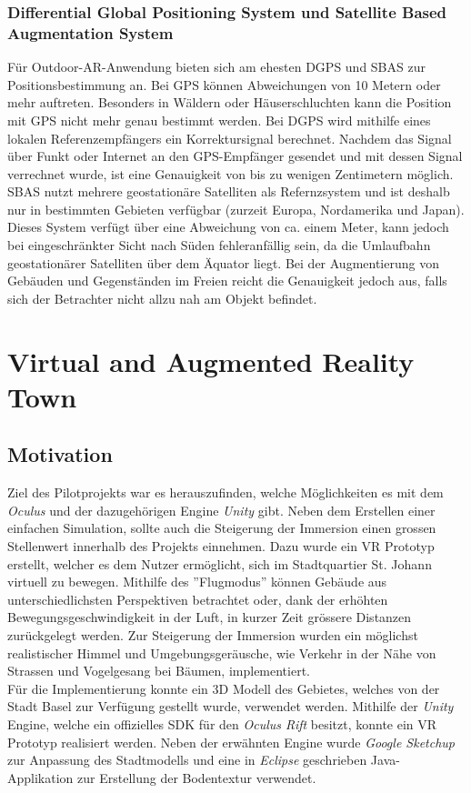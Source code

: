 \subsection*{Differential Global Positioning System und Satellite Based Augmentation System}
Für Outdoor-AR-Anwendung bieten sich am ehesten DGPS und SBAS zur Positionsbestimmung an. Bei GPS können Abweichungen von 10 Metern oder mehr auftreten. Besonders in Wäldern oder Häuserschluchten kann die Position mit GPS nicht mehr genau bestimmt werden. Bei DGPS wird mithilfe eines lokalen Referenzempfängers ein Korrektursignal berechnet. Nachdem das Signal über Funkt oder Internet an den GPS-Empfänger gesendet und mit dessen Signal verrechnet wurde, ist eine Genauigkeit von bis zu wenigen Zentimetern möglich.\\[6pt]
SBAS nutzt mehrere geostationäre Satelliten als Refernzsystem und ist deshalb nur in bestimmten Gebieten verfügbar (zurzeit Europa, Nordamerika und Japan). Dieses System verfügt über eine Abweichung von ca. einem Meter, kann jedoch bei eingeschränkter Sicht nach Süden fehleranfällig sein, da die Umlaufbahn geostationärer Satelliten über dem Äquator liegt. Bei der Augmentierung von Gebäuden und Gegenständen im Freien reicht die Genauigkeit jedoch aus, falls sich der Betrachter nicht allzu nah am Objekt befindet.\cite[S.~253~ff.]{doerner13}

\chapter{Virtual and Augmented Reality Town}\label{c.towndemo}
\vspace{-20pt}
\section{Motivation}\label{s.vrintro}
Ziel des Pilotprojekts war es herauszufinden, welche Möglichkeiten es mit dem \textit{Oculus} und der dazugehörigen Engine \textit{Unity} gibt. Neben dem Erstellen einer einfachen Simulation, sollte auch die Steigerung der Immersion einen grossen Stellenwert innerhalb des Projekts einnehmen. Dazu wurde ein VR Prototyp erstellt, welcher es dem Nutzer ermöglicht, sich im Stadtquartier St. Johann virtuell zu bewegen. Mithilfe des ''Flugmodus'' können Gebäude aus unterschiedlichsten Perspektiven betrachtet oder, dank der erhöhten Bewegungsgeschwindigkeit in der Luft, in kurzer Zeit grössere Distanzen zurückgelegt werden. Zur Steigerung der Immersion wurden ein möglichst realistischer Himmel und Umgebungsgeräusche, wie Verkehr in der Nähe von Strassen und Vogelgesang bei Bäumen, implementiert.\\[6pt]
Für die Implementierung konnte ein 3D Modell des Gebietes, welches von der Stadt Basel zur Verfügung gestellt wurde, verwendet werden. Mithilfe der \textit{Unity} Engine, welche ein offizielles SDK für den \textit{Oculus Rift} besitzt, konnte ein VR Prototyp realisiert werden. Neben der erwähnten Engine wurde \textit{Google Sketchup} zur Anpassung des Stadtmodells und eine in \textit{Eclipse} geschrieben Java-Applikation zur Erstellung der Bodentextur verwendet.
\newpage
